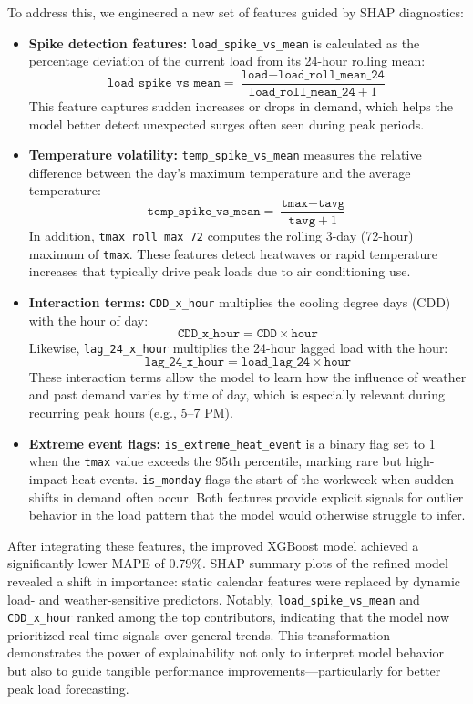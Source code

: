 \documentclass[final,numbered]{ifacconf}
\begin{document}
To address this, we engineered a new set of features guided by SHAP diagnostics:
\begin{itemize}
    \item \textbf{Spike detection features:} \texttt{load\_spike\_vs\_mean} is calculated as the percentage deviation of the current load from its 24-hour rolling mean:
    \[
        \texttt{load\_spike\_vs\_mean} = \frac{\texttt{load} - \texttt{load\_roll\_mean\_24}}{\texttt{load\_roll\_mean\_24} + 1}
    \]
    This feature captures sudden increases or drops in demand, which helps the model better detect unexpected surges often seen during peak periods.
    \newline
    \item \textbf{Temperature volatility:} \texttt{temp\_spike\_vs\_mean} measures the relative difference between the day's maximum temperature and the average temperature:
    \[
        \texttt{temp\_spike\_vs\_mean} = \frac{\texttt{tmax} - \texttt{tavg}}{\texttt{tavg} + 1}
    \]
    In addition, \texttt{tmax\_roll\_max\_72} computes the rolling 3-day (72-hour) maximum of \texttt{tmax}. These features detect heatwaves or rapid temperature increases that typically drive peak loads due to air conditioning use.
    \newline
    \item \textbf{Interaction terms:} \texttt{CDD\_x\_hour} multiplies the cooling degree days (CDD) with the hour of day:
    \[
        \texttt{CDD\_x\_hour} = \texttt{CDD} \times \texttt{hour}
    \]
    Likewise, \texttt{lag\_24\_x\_hour} multiplies the 24-hour lagged load with the hour:
    \[
        \texttt{lag\_24\_x\_hour} = \texttt{load\_lag\_24} \times \texttt{hour}
    \]
    These interaction terms allow the model to learn how the influence of weather and past demand varies by time of day, which is especially relevant during recurring peak hours (e.g., 5–7 PM).
    \newline
    \item \textbf{Extreme event flags:} \texttt{is\_extreme\_heat\_event} is a binary flag set to 1 when the \texttt{tmax} value exceeds the 95th percentile, marking rare but high-impact heat events. \texttt{is\_monday} flags the start of the workweek when sudden shifts in demand often occur. Both features provide explicit signals for outlier behavior in the load pattern that the model would otherwise struggle to infer.
\end{itemize}


After integrating these features, the improved XGBoost model achieved a significantly lower MAPE of 0.79\%. SHAP summary plots of the refined model revealed a shift in importance: static calendar features were replaced by dynamic load- and weather-sensitive predictors. Notably, \texttt{load\_spike\_vs\_mean} and \texttt{CDD\_x\_hour} ranked among the top contributors, indicating that the model now prioritized real-time signals over general trends. This transformation demonstrates the power of explainability not only to interpret model behavior but also to guide tangible performance improvements—particularly for better peak load forecasting.
\end{document}
